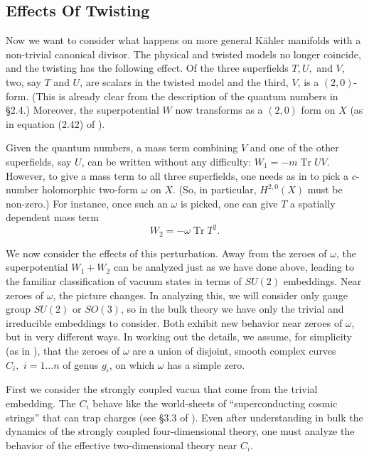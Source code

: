 \documentclass[12pt]{article}
\numberwithin{equation}{section}
\DeclareMathOperator{\Tr}{Tr}
\begin{document}
\subsection{Effects Of Twisting}

Now we want to consider what happens on more general K\"ahler manifolds
with a non-trivial canonical divisor.  The physical and twisted
models no longer coincide, and the twisting has the following effect.
Of the three superfields $T,U,$ and $V$, two, say $T$ and $U$,
are scalars in the twisted
model and the third, $V$, is a $(2,0)$-form.  (This is already clear
from the description of the quantum numbers in \S2.4.)  Moreover,
the superpotential $W$ now transforms as a $(2,0)$ form on
$X$ (as in equation (2.42) of \cite{switten}).

Given the quantum numbers, a mass term combining $V$ and one of the
other superfields, say $U$, can be written without any difficulty:
$W_1=-m\Tr UV$.  However, to give a mass term to all three superfields,
one needs as in \cite{switten} to pick a $c$-number holomorphic
two-form $\omega$
on $X$.  (So, in particular, $H^{2,0}(X)$ must be non-zero.)
For instance, once such an $\omega$ is picked, one can give
$T$ a spatially dependent mass term
\begin{equation}
  \label{wtwo}
  W_2=-\omega \Tr T^2.
\end{equation}

We now consider the effects of this perturbation.  Away from the zeroes
of $\omega$, the superpotential $W_1+W_2$ can be analyzed just as
we have done above, leading to the familiar classification of vacuum
states in terms of $SU(2)$ embeddings.
Near zeroes of $\omega$, the picture changes.  In analyzing
this, we will consider only gauge group $SU(2)$ or $SO(3)$, so in
the bulk theory we have only the trivial and irreducible embeddings
to consider.  Both exhibit new behavior near zeroes of $\omega$, but in
very different ways.  In working out the details, we assume, for simplicity
(as in \cite{switten}), that the zeroes of $\omega$ are a union of disjoint,
smooth complex curves $C_i,\,\,i=1\dots n$ of genus $g_i$, on which $\omega$
has
a simple zero.

\bigskip
{}

First we consider the strongly coupled vacua that come from the trivial
embedding.  The $C_i$ behave like the world-sheets of
``superconducting cosmic strings''
that can trap charges (see \S3.3 of \cite{switten}).  Even after understanding
in bulk the dynamics of the strongly coupled four-dimensional theory,
one must analyze the behavior of the effective two-dimensional theory
near $C_i$.
\end{document}
